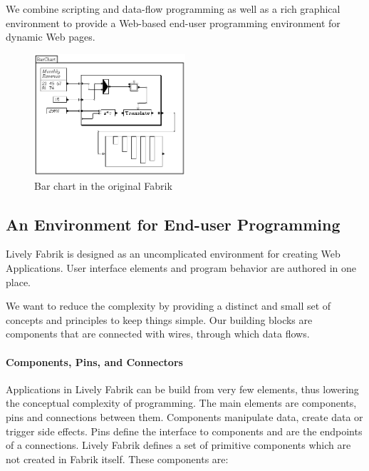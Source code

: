 \documentclass[pdftex, times, 10pt, twocolumn]{article}
\begin{document}
We combine scripting and data-flow programming as well as a rich graphical environment to provide a Web-based end-user programming environment for dynamic Web pages.  



\begin{figure}[]\centering
\includegraphics[width=0.500000\textwidth]{Fabrik_figure6.png} 

\caption{Bar chart in the original Fabrik ~\cite{Ingalls1988FVP} }
\label{fig:FabrikBarChart}
\end{figure}


\subsection{An Environment for End-user Programming}
Lively Fabrik is designed as an uncomplicated environment for creating Web Applications. User interface elements and program behavior are authored in one place.  

We want to reduce the complexity by providing a distinct and small set of concepts and principles to keep things simple. Our building blocks are components that are connected with wires, through which data flows.  



\paragraph{Components, Pins, and Connectors}
Applications in Lively Fabrik can be build from very few elements, thus lowering the conceptual complexity of programming. The main elements are components, pins and connections between them. Components manipulate data, create data or trigger side effects. Pins define the interface to components and are the endpoints of a connections. Lively Fabrik defines a set of primitive components which are not created in Fabrik itself. These components are: 
\end{document}
